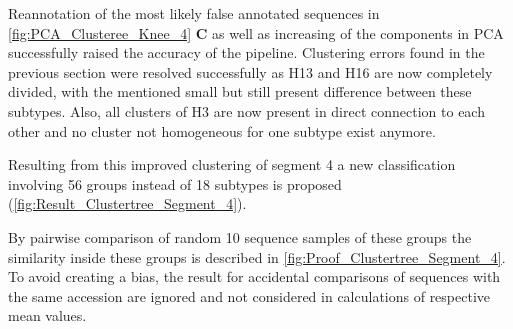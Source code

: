 Reannotation of the most likely false annotated sequences in \autoref{fig:PCA_Clusteree_Knee_4} \textbf{\textsf{C}} as well as increasing of the components in \gls{PCA} successfully raised the accuracy of the pipeline. Clustering errors found in the previous section were resolved successfully as H13 and H16 are now completely divided, with the mentioned small but still present difference between these subtypes. Also, all clusters of H3 are now present in direct connection to each other and no cluster not homogeneous for one subtype exist anymore. 

Resulting from this improved clustering of segment 4 a new classification involving 56 groups instead of 18 subtypes is proposed (\autoref{fig:Result_Clustertree_Segment_4}).

By pairwise comparison of random 10 sequence samples of these groups the similarity inside these groups is described in \autoref{fig:Proof_Clustertree_Segment_4}. To avoid creating a bias, the result for accidental comparisons of sequences with the same accession are ignored and not considered in calculations of respective mean values.

